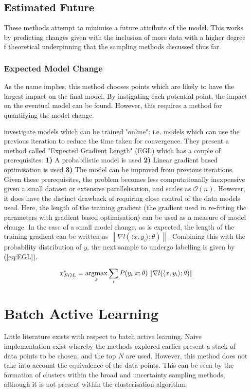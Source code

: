 \subsection{Estimated Future}
These methods attempt to minimise a future attribute of the model. This works by predicting changes given with the inclusion of more data with a higher degree f theoretical underpinning that the sampling methods discussed thus far.

\subsubsection{Expected Model Change}
As the name implies, this method chooses points which are likely to have the largest impact on the final model. By instigating each potential point, the impact on the eventual model can be found. However, this requires a method for quantifying the model change.

\textcite{Set08,Set09} investigate models which can be trained "online": i.e. models which can use the previous iteration to reduce the time taken for convergence. They present a method called "Expected Gradient Length" (EGL) which has a couple of prerequisites: \textbf{1)} A probabilistic model is used \textbf{2)} Linear gradient based optimisation is used \textbf{3)} The model can be improved from previous iterations. Given these prerequisites, the problem becomes less computationally inexpensive given a small dataset or extensive parallelisation, and scales as $\mathcal{O}(n)$. However, it does have the distinct drawback of requiring close control of the data models used. Here, the length of the training gradient (the gradient used in re-fitting the parameters with gradient based optimisation) can be used as a measure of model change. In the case of a small model change, as is expected, the length of the training gradient can be written as ${\left\|\nabla{}l(\langle{}x, y_i\rangle{};\theta{})\right\|}$. Combining this with the probability distribution of $y$, the next sample to undergo labelling is given by (\ref{eq:EGL}).

\begin{equation}
    \label{eq:EGL}
    x_{EGL}^*=\operatorname*{argmax}_x{\sum_i{P(y_i|x;\theta{})\left\|\nabla{}l(\langle{}x, y_i\rangle{};\theta{})\right\|}}
\end{equation}


\section{Batch Active Learning}
Little literature exists with respect to batch active learning. Naive implementation exist whereby the methods explored earlier present a stack of data points to be chosen, and the top $N$ are used. However, this method does not take into account the equivalence of the data points. This can be seen by the formation of clusters within the broad and uncertainty sampling methods, although it is not present within the clusterisation algorithm.

